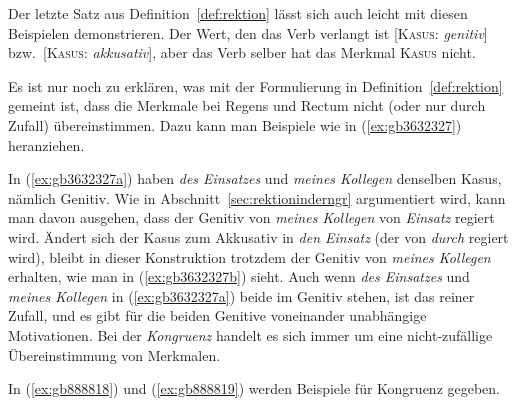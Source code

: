 \begin{exe}
  \ex
  \begin{xlist}
  \end{xlist}
\end{exe}

Der letzte Satz aus Definition~\ref{def:rektion} lässt sich auch leicht mit diesen Beispielen demonstrieren.
Der Wert, den das Verb verlangt ist [\textsc{Kasus}: \textit{genitiv}] bzw.\ [\textsc{Kasus}: \textit{akkusativ}], aber das Verb selber hat das Merkmal \textsc{Kasus} nicht.

Es ist nur noch zu erklären, was mit der Formulierung in Definition~\ref{def:rektion} gemeint ist, dass die Merkmale bei Regens und Rectum nicht (oder nur durch Zufall) übereinstimmen.
Dazu kann man Beispiele wie in (\ref{ex:gb3632327}) heranziehen.

\begin{exe}
  \ex\label{ex:gb3632327} 
  \begin{xlist}
  \end{xlist}
\end{exe}

In (\ref{ex:gb3632327a}) haben \textit{des Einsatzes} und \textit{meines Kollegen} denselben Kasus, nämlich Genitiv.
Wie in Abschnitt~\ref{sec:rektioninderngr} argumentiert wird, kann man davon ausgehen, dass der Genitiv von \textit{meines Kollegen} von \textit{Einsatz} regiert wird.
Ändert sich der Kasus zum Akkusativ in \textit{den Einsatz} (der von \textit{durch} regiert wird), bleibt in dieser Konstruktion trotzdem der Genitiv von \textit{meines Kollegen} erhalten, wie man in (\ref{ex:gb3632327b}) sieht.
Auch wenn \textit{des Einsatzes} und \textit{meines Kollegen} in (\ref{ex:gb3632327a}) beide im Genitiv stehen, ist das reiner Zufall, und es gibt für die beiden Genitive voneinander unabhängige Motivationen.
Bei der \textit{Kongruenz} handelt es sich immer um eine nicht-zufällige Übereinstimmung von Merkmalen.


In (\ref{ex:gb888818}) und (\ref{ex:gb888819}) werden Beispiele für Kongruenz gegeben.

